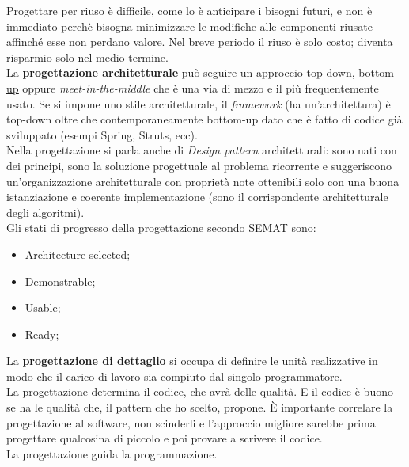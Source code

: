 		Progettare per riuso è difficile, come lo è anticipare i bisogni futuri, e non è immediato perchè bisogna minimizzare le modifiche alle componenti riusate affinché esse non perdano valore. Nel breve periodo il riuso è solo costo; diventa risparmio solo nel medio termine.\\
		La \textbf{progettazione architetturale} può seguire un approccio \underline{\hyperref[topdown]{top-down}}, \underline{\hyperref[bottomup]{bottom-up}} oppure \textit{meet-in-the-middle} che è una via di mezzo e il più frequentemente usato. Se si impone uno stile architetturale, il \textit{framework} (ha un'architettura) è top-down oltre che contemporaneamente bottom-up dato che è fatto di codice già sviluppato (esempi Spring, Struts, ecc).\\
		Nella progettazione si parla anche di \textit{Design pattern} architetturali: sono nati con dei principi, sono la soluzione progettuale al problema ricorrente e suggeriscono un'organizzazione architetturale con proprietà note ottenibili solo con una buona istanziazione e coerente implementazione (sono il corrispondente architetturale degli algoritmi). \\
		
		Gli stati di progresso della progettazione secondo \underline{\hyperref[semat]{SEMAT}} sono:
			\begin{itemize}
				\item \underline{\hyperref[architectureselected]{Architecture selected}};
				\item \underline{\hyperref[demonstrable]{Demonstrable}};	
				\item \underline{\hyperref[usable]{Usable}};
				\item \underline{\hyperref[ready]{Ready}};									
			\end{itemize}
		
		La \textbf{progettazione di dettaglio} si occupa di definire le \underline{\hyperref[unita]{unità}} realizzative in modo che il carico di lavoro sia compiuto dal singolo programmatore.\\
		La progettazione determina il codice, che avrà delle \underline{\hyperref[qualita]{qualità}}.
		E il codice è buono se ha le qualità che, il pattern che ho scelto, propone. 
		È importante correlare la progettazione al software, non scinderli e l'approccio migliore sarebbe prima progettare qualcosina di piccolo e poi provare a scrivere il codice.\\
		La progettazione guida la programmazione.
		
